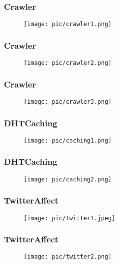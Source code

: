 \documentclass{beamer}
\begin{document}
\begin{frame}
\frametitle{Crawler}
\begin{figure}
\texttt{[image: pic/crawler1.png]}
\end{figure}
\end{frame}
\begin{frame}
\frametitle{Crawler}
\begin{figure}
\texttt{[image: pic/crawler2.png]}
\end{figure}
\end{frame}
\begin{frame}
\frametitle{Crawler}
\begin{figure}
\texttt{[image: pic/crawler3.png]}
\end{figure}
\end{frame}


\begin{frame}
\frametitle{DHTCaching}
\begin{figure}
\texttt{[image: pic/caching1.png]}
\end{figure}
\end{frame}
\begin{frame}
\frametitle{DHTCaching}
\begin{figure}
\texttt{[image: pic/caching2.png]}
\end{figure}
\end{frame}





\begin{frame}
\frametitle{TwitterAffect}
\begin{figure}
\texttt{[image: pic/twitter1.jpeg]}
\end{figure}
\end{frame}
\begin{frame}
\frametitle{TwitterAffect}
\begin{figure}
\texttt{[image: pic/twitter2.png]}
\end{figure}
\end{frame}
\end{document}
